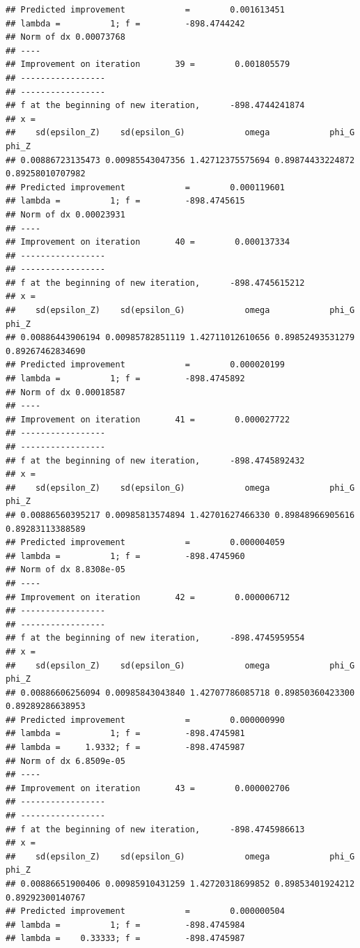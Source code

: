 \documentclass[12pt,a4paper,]{article}
\newcommand{\0}{\mathbf{0}}
\begin{document}
\begin{verbatim}
## Predicted improvement            =        0.001613451
## lambda =          1; f =         -898.4744242 
## Norm of dx 0.00073768
## ----
## Improvement on iteration       39 =        0.001805579
## -----------------
## -----------------
## f at the beginning of new iteration,      -898.4744241874 
## x =
##    sd(epsilon_Z)    sd(epsilon_G)            omega            phi_G            phi_Z 
## 0.00886723135473 0.00985543047356 1.42712375575694 0.89874433224872 0.89258010707982 
## Predicted improvement            =        0.000119601
## lambda =          1; f =         -898.4745615 
## Norm of dx 0.00023931
## ----
## Improvement on iteration       40 =        0.000137334
## -----------------
## -----------------
## f at the beginning of new iteration,      -898.4745615212 
## x =
##    sd(epsilon_Z)    sd(epsilon_G)            omega            phi_G            phi_Z 
## 0.00886443906194 0.00985782851119 1.42711012610656 0.89852493531279 0.89267462834690 
## Predicted improvement            =        0.000020199
## lambda =          1; f =         -898.4745892 
## Norm of dx 0.00018587
## ----
## Improvement on iteration       41 =        0.000027722
## -----------------
## -----------------
## f at the beginning of new iteration,      -898.4745892432 
## x =
##    sd(epsilon_Z)    sd(epsilon_G)            omega            phi_G            phi_Z 
## 0.00886560395217 0.00985813574894 1.42701627466330 0.89848966905616 0.89283113388589 
## Predicted improvement            =        0.000004059
## lambda =          1; f =         -898.4745960 
## Norm of dx 8.8308e-05
## ----
## Improvement on iteration       42 =        0.000006712
## -----------------
## -----------------
## f at the beginning of new iteration,      -898.4745959554 
## x =
##    sd(epsilon_Z)    sd(epsilon_G)            omega            phi_G            phi_Z 
## 0.00886606256094 0.00985843043840 1.42707786085718 0.89850360423300 0.89289286638953 
## Predicted improvement            =        0.000000990
## lambda =          1; f =         -898.4745981 
## lambda =     1.9332; f =         -898.4745987 
## Norm of dx 6.8509e-05
## ----
## Improvement on iteration       43 =        0.000002706
## -----------------
## -----------------
## f at the beginning of new iteration,      -898.4745986613 
## x =
##    sd(epsilon_Z)    sd(epsilon_G)            omega            phi_G            phi_Z 
## 0.00886651900406 0.00985910431259 1.42720318699852 0.89853401924212 0.89292300140767 
## Predicted improvement            =        0.000000504
## lambda =          1; f =         -898.4745984 
## lambda =    0.33333; f =         -898.4745987 

\end{verbatim}
\end{document}
